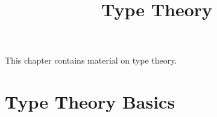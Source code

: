 

%



\title{Type Theory}

\maketitle

\label{section-phantom}

This chapter contains material on type theory.

\ChapterTableOfContents

\section{Type Theory Basics}\label{section-type-theory-basics}
